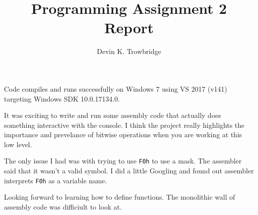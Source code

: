 \documentclass[a4paper,10pt]{article}
\title{Programming Assignment 2 Report}
\author{Devin K. Trowbridge}
\begin{document}
\maketitle

Code compiles and runs successfully on Windows 7 using VS 2017 (v141) targeting Windows SDK 10.0.17134.0.

It was exciting to write and run some assembly code that actually does something interactive with the console. I think the project really highlights the importance and prevelance of bitwise operations when you are working at this low level.

The only issue I had was with trying to use \verb|F0h| to use a mask. The assembler said that it wasn't a valid symbol. I did a little Googling and found out assembler interprets \verb|F0h| as a variable name.

Looking forward to learning how to define functions. The monolithic wall of assembly code was difficiult to look at.
\end{document}
